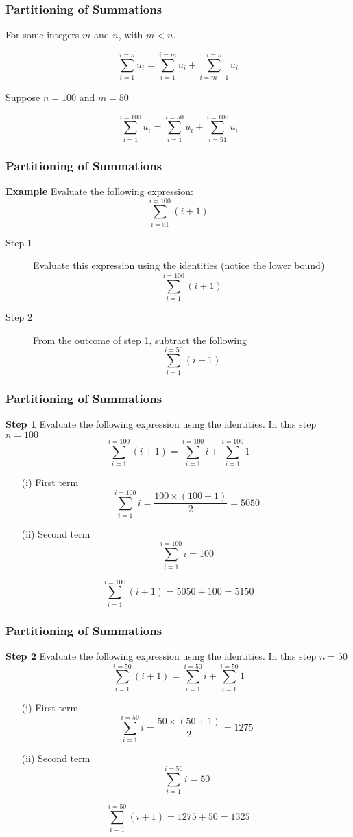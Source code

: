 \documentclass{beamer}
\begin{document}
\begin{frame}
\frametitle{Partitioning of Summations}
\large

For some integers $m$ and $n$, with $m<n$.

\[ \sum^{i=n}_{i=1} u_{i} = \sum^{i=m}_{i=1} u_{i} + \sum^{i=n}_{i=m+1} u_{i}\]

Suppose $n=100$ and $m=50$

\[ \sum^{i=100}_{i=1} u_{i} = \sum^{i=50}_{i=1} u_{i} + \sum^{i=100}_{i=51} u_{i}\]

\end{frame}
\begin{frame}
\frametitle{Partitioning of Summations}
\large
\textbf{Example}
Evaluate the following expression:
\[ \sum^{i=100}_{i=51} (i+1) \]

\begin{description}
\item[Step 1] Evaluate this expression using the identities (notice the lower bound)
\[ \sum^{i=100}_{i=1} (i+1) \]
\item[Step 2] From the outcome of step 1, subtract the following
\[ \sum^{i=50}_{i=1} (i+1) \]
\end{description}

\end{frame}
\begin{frame}
\frametitle{Partitioning of Summations}
\large
\textbf{Step 1} Evaluate the following expression using the identities. In this step $n=100$
\[ \sum^{i=100}_{i=1} (i+1)  = \sum^{i=100}_{i=1} i  +  \sum^{i=100}_{i=1} 1  \]

\begin{itemize}
\item[(i)] First term \[\sum^{i=100}_{i=1} i  = \frac{100\times(100+1)}{2}  = 5050\]

\item[(ii)] Second term \[ \sum^{i=100}_{i=1} i  =  100\]
\end{itemize}

\[ \sum^{i=100}_{i=1} (i+1)  = 5050 + 100 = 5150 \]

\end{frame}
\begin{frame}
\frametitle{Partitioning of Summations}
\large
\textbf{Step 2} Evaluate the following expression using the identities. In this step $n=50$
\[ \sum^{i=50}_{i=1} (i+1)  = \sum^{i=50}_{i=1} i  +  \sum^{i=50}_{i=1} 1  \]

\begin{itemize}
\item[(i)] First term \[\sum^{i=50}_{i=1} i  = \frac{50\times(50+1)}{2}  = 1275\]

\item[(ii)] Second term \[ \sum^{i=50}_{i=1} i  =  50\]
\end{itemize}

\[ \sum^{i=50}_{i=1} (i+1)  = 1275 + 50 = 1325 \]

\end{frame}
\end{document}
